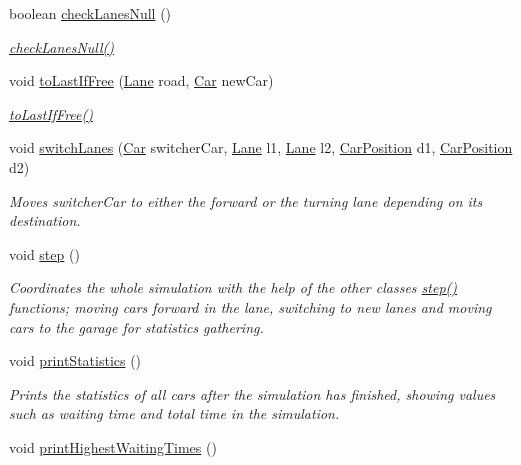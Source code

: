 \begin{DoxyCompactItemize}
boolean \hyperlink{class_traffic_system_a435ee335df994e7c45ae0ad6c73d0d91}{check\+Lanes\+Null} ()
\begin{DoxyCompactList}\small\item\em \hyperlink{class_traffic_system_a435ee335df994e7c45ae0ad6c73d0d91}{check\+Lanes\+Null()} \end{DoxyCompactList}\item 
void \hyperlink{class_traffic_system_af3d20b7295d2989db50e6febf36033ae}{to\+Last\+If\+Free} (\hyperlink{class_lane}{Lane} road, \hyperlink{class_car}{Car} new\+Car)
\begin{DoxyCompactList}\small\item\em \hyperlink{class_traffic_system_af3d20b7295d2989db50e6febf36033ae}{to\+Last\+If\+Free()} \end{DoxyCompactList}\item 
void \hyperlink{class_traffic_system_acf4b83b81140ed9254b024afb35e0e60}{switch\+Lanes} (\hyperlink{class_car}{Car} switcher\+Car, \hyperlink{class_lane}{Lane} l1, \hyperlink{class_lane}{Lane} l2, \hyperlink{class_car_position}{Car\+Position} d1, \hyperlink{class_car_position}{Car\+Position} d2)
\begin{DoxyCompactList}\small\item\em Moves switcher\+Car to either the forward or the turning lane depending on its destination. \end{DoxyCompactList}\item 
\hypertarget{class_traffic_system_ab6c1cf4dad2e420a9437dde8cb3af921}{void \hyperlink{class_traffic_system_ab6c1cf4dad2e420a9437dde8cb3af921}{step} ()}\label{class_traffic_system_ab6c1cf4dad2e420a9437dde8cb3af921}

\begin{DoxyCompactList}\small\item\em Coordinates the whole simulation with the help of the other classes \hyperlink{class_traffic_system_ab6c1cf4dad2e420a9437dde8cb3af921}{step()} functions; moving cars forward in the lane, switching to new lanes and moving cars to the garage for statistics gathering. \end{DoxyCompactList}\item 
\hypertarget{class_traffic_system_a1bac8350985fab6d29a6172ecb5100e1}{void \hyperlink{class_traffic_system_a1bac8350985fab6d29a6172ecb5100e1}{print\+Statistics} ()}\label{class_traffic_system_a1bac8350985fab6d29a6172ecb5100e1}

\begin{DoxyCompactList}\small\item\em Prints the statistics of all cars after the simulation has finished, showing values such as waiting time and total time in the simulation. \end{DoxyCompactList}\item 
\hypertarget{class_traffic_system_a71e59c328ac605b5bd499002dcde1ecf}{void \hyperlink{class_traffic_system_a71e59c328ac605b5bd499002dcde1ecf}{print\+Highest\+Waiting\+Times} ()}\label{class_traffic_system_a71e59c328ac605b5bd499002dcde1ecf}


\end{DoxyCompactItemize}
